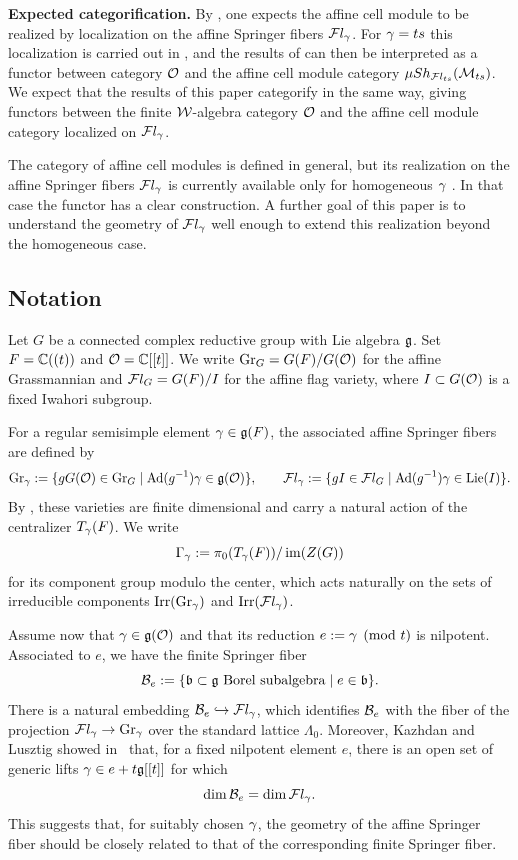 \documentclass[11pt]{article}
\numberwithin{equation}{section}
\begin{document}
\medskip
\noindent\textbf{Expected categorification.}
By \cite{BBAMY}, one expects the affine cell module to be realized by localization on
the affine Springer fibers $\mathcal{F} l_\gamma$. For $\gamma = ts$ this localization is carried out
in \cite{BBAMY2}, and the results of \cite{remarkASF} can then be interpreted
as a functor between category $\mathcal{O}$ and the affine cell module category
$\mu Sh_{\mathcal{F} l_{ts}}(\mathcal{M}_{ts})$. We expect that the results of this paper
categorify in the same way, giving functors between the finite $\mathcal{W}$-algebra category
$\mathcal{O}$ and the affine cell module category localized on $\mathcal{F} l_\gamma$.

The category of affine cell modules is defined in general, but its realization on the
affine Springer fibers $\mathcal{F} l_\gamma$ is currently available only for homogeneous $\gamma$
\cite{BBAMY}. In that case the functor has a clear construction. A further goal of
this paper is to understand the geometry of $\mathcal{F} l_\gamma$ well enough to extend this
realization beyond the homogeneous case.

\subsection{Notation}

Let $G$ be a connected complex reductive group with Lie algebra $\mathfrak{g}$.
Set $F=\mathbb{C}((t))$ and $\mathcal{O}=\mathbb{C}[[t]]$.
We write $\operatorname{Gr}_G=G(F)/G(\mathcal{O})$ for the affine Grassmannian and
$\mathcal{F} l_G=G(F)/I$ for the affine flag variety, where $I\subset G(\mathcal{O})$
is a fixed Iwahori subgroup.

For a regular semisimple element $\gamma\in \mathfrak{g}(F)$, the associated
affine Springer fibers are defined by
\[
\operatorname{Gr}_\gamma := \{ gG(\mathcal{O})\in \operatorname{Gr}_G \mid \operatorname{Ad}(g^{-1})\gamma \in \mathfrak{g}(\mathcal{O})\},
\qquad
\mathcal{F} l_\gamma := \{ gI\in\mathcal{F} l_G \mid \operatorname{Ad}(g^{-1})\gamma \in \operatorname{Lie}(I)\}.
\]
By \cite{KL88}, these varieties are finite dimensional and carry
a natural action of the centralizer $T_\gamma(F)$. We write
\[
\Gamma_\gamma:=
\pi_0(T_\gamma(F))/\operatorname{im}(Z(G))
\]
for its component group modulo the center, which acts naturally
on the sets of irreducible components $\operatorname{Irr}(\operatorname{Gr}_\gamma)$ and $\operatorname{Irr}(\mathcal{F}l_\gamma)$.

Assume now that $\gamma\in\mathfrak{g}(\mathcal{O})$ and that its reduction $e:=\gamma\pmod t$ is nilpotent. Associated to $e$, we have the finite Springer fiber
\[
\mathcal{B}_e := \{ \mathfrak{b}\subset\mathfrak{g} \text{ Borel subalgebra} \mid e\in\mathfrak{b}\}.
\]
There is a natural embedding $\mathcal{B}_e\hookrightarrow\mathcal{F} l_\gamma$, which identifies $\mathcal{B}_e$ with the fiber of the projection
$\mathcal{F} l_\gamma\to\operatorname{Gr}_\gamma$ over the standard lattice $\Lambda_0$. Moreover, Kazhdan and Lusztig showed in~\cite{KL88} that, for a fixed
nilpotent element $e$, there is an open set of generic lifts
$\gamma\in e+t\mathfrak{g}[[t]]$ for which
\[
\dim\mathcal{B}_e=\dim\mathcal{F} l_\gamma.
\]
This suggests that, for suitably chosen $\gamma$, the geometry of the affine
Springer fiber should be closely related to that of the corresponding
finite Springer fiber.
\end{document}
